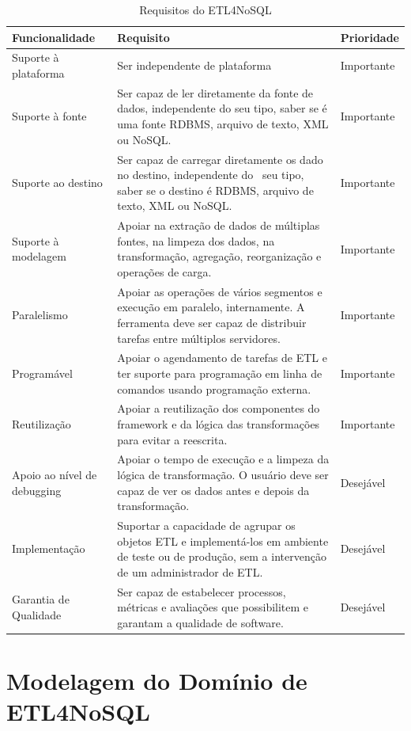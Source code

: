 \begin{table}[h]
	\centering
	\caption{Requisitos do ETL4NoSQL}
	\label{requisitos}
	\begin{tabular}{|p{3cm}| p{10cm}| p{2cm} |}
		\hline
		Funcionalidade & Requisito & Prioridade\\
		\hline
		Suporte à plataforma &  Ser independente de plataforma & Importante\\
		\hline
		Suporte à fonte &  Ser capaz de ler diretamente da fonte de dados, independente do seu tipo, saber se é uma fonte RDBMS, arquivo de texto, XML ou NoSQL. & Importante\\
		\hline
		Suporte ao destino & Ser capaz de carregar diretamente os dado no destino, independente do  seu tipo, saber se o destino é RDBMS, arquivo de texto, XML ou NoSQL. & Importante\\
		\hline
		Suporte à modelagem & Apoiar na extração de dados de múltiplas fontes, na limpeza dos dados, na transformação, agregação, reorganização e operações de carga. & Importante\\
		\hline
		Paralelismo &Apoiar as operações de vários segmentos e execução em paralelo, internamente. A ferramenta deve ser capaz de distribuir tarefas entre múltiplos servidores. & Importante\\
		\hline
		Programável &Apoiar o agendamento de tarefas de ETL e ter suporte para programação em linha de comandos usando programação externa. & Importante\\
		\hline
		Reutilização & Apoiar a reutilização dos componentes do framework e da lógica das transformações para evitar a reescrita. & Importante\\
		\hline
		Apoio ao nível de debugging & Apoiar o tempo de execução e a limpeza da lógica de transformação. O usuário deve ser capaz de ver os dados antes e depois da transformação. & Desejável\\
		\hline
		Implementação & Suportar a capacidade de agrupar os objetos ETL e implementá-los em ambiente de teste ou de produção, sem a intervenção de um administrador de ETL. & Desejável\\
		\hline
		Garantia de Qualidade & Ser capaz de estabelecer processos, métricas e avaliações que possibilitem e garantam a qualidade de software. & Desejável\\
		\hline
		
		
	\end{tabular}
\end{table}


\section{Modelagem do Domínio de ETL4NoSQL}

